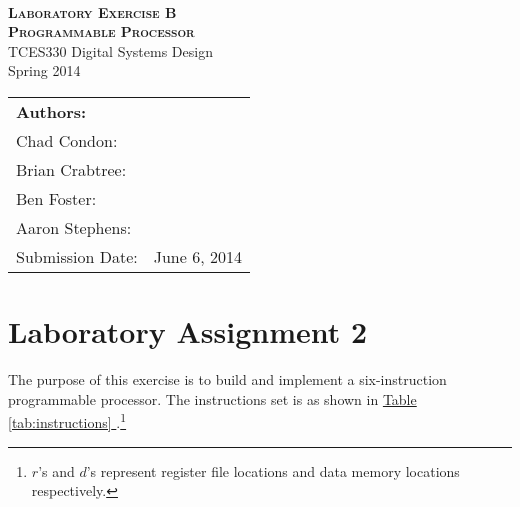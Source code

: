\documentclass[12pt]{article}
\begin{document}
\begin{titlepage}
    \center
    \qquad\\[7cm]
    \textsc{\huge \bfseries Laboratory Exercise B} \\[.5cm]
    \textsc{\huge \bfseries Programmable Processor} \\[1.0cm]
    {\large TCES330 Digital Systems Design} \\[.5cm]
    {\large Spring 2014} \\[1.5cm]
    
    \begin{tabular}{ll}
        \multicolumn{2}{l}{\textbf{Authors:}}   \\
        Chad Condon:        & \underline{\hspace{5cm}} \\
        Brian Crabtree:     & \underline{\hspace{5cm}} \\
        Ben Foster:         & \underline{\hspace{5cm}} \\
        Aaron Stephens:     & \underline{\hspace{5cm}} \\
        Submission Date:    & June 6, 2014
    \end{tabular}
    
\end{titlepage}

\tableofcontents
\pagebreak

\section*{Laboratory Assignment 2}  \FloatBarrier

The purpose of this exercise is to build and implement a six-instruction programmable processor.
The instructions set is as shown in \hyperref[tab:intructions]{Table \ref*{tab:instructions} }.\footnote{$r$'s and $d$'s represent register file locations and data memory locations respectively.}
\end{document}
